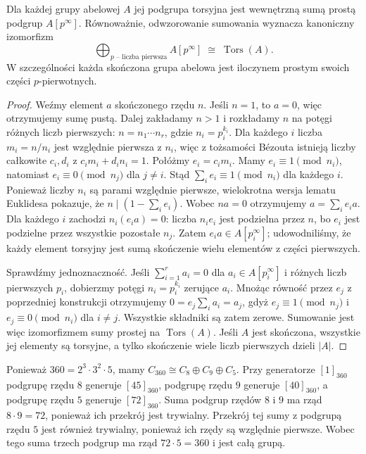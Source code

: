 \begin{twierdzenie}
\label{aa:tw:torsion-primary}
Dla każdej grupy abelowej $A$ jej podgrupa torsyjna jest
wewnętrzną sumą prostą podgrup $A[p^\infty]$.
Równoważnie, odwzorowanie sumowania wyznacza kanoniczny izomorfizm
\[
\bigoplus_{p\text{ -- liczba pierwsza}}A[p^\infty]
 \;\cong\;\operatorname{Tors}(A).
\]
W szczególności każda skończona grupa abelowa jest
iloczynem prostym swoich części $p$-pierwotnych.
\end{twierdzenie}
\begin{proof}
Weźmy element $a$ skończonego rzędu $n$.
Jeśli $n=1$, to $a=0$, więc otrzymujemy sumę pustą.
Dalej zakładamy $n>1$ i rozkładamy $n$ na potęgi różnych liczb pierwszych:
$n=n_1\cdots n_r$, gdzie $n_i=p_i^{k_i}$.
Dla każdego $i$ liczba $m_i=n/n_i$ jest względnie pierwsza
z $n_i$, więc z tożsamości Bézouta istnieją liczby całkowite
$c_i,d_i$ z $c_i m_i+d_i n_i=1$.
Połóżmy $e_i=c_i m_i$. Mamy $e_i\equiv1\pmod{n_i}$,
natomiast $e_i\equiv0\pmod{n_j}$ dla $j\ne i$.
Stąd $\sum_i e_i\equiv1\pmod {n_i}$ dla każdego $i$.
Ponieważ liczby $n_i$ są parami względnie pierwsze,
wielokrotna wersja lematu Euklidesa pokazuje, że
$n\mid(1-\sum_i e_i)$.
Wobec $na=0$ otrzymujemy
$a=\sum_i e_i a$.
Dla każdego $i$ zachodzi $n_i(e_i a)=0$:
liczba $n_i e_i$ jest podzielna przez $n$, bo $e_i$
jest podzielne przez wszystkie pozostałe $n_j$.
Zatem $e_i a\in A[p_i^\infty]$; udowodniliśmy, że
każdy element torsyjny jest sumą skończenie wielu elementów
z części pierwszych.

Sprawdźmy jednoznaczność. Jeśli
$\sum_{i=1}^r a_i=0$ dla $a_i\in A[p_i^\infty]$
i różnych liczb pierwszych $p_i$, dobierzmy potęgi
$n_i=p_i^{k_i}$ zerujące $a_i$. Mnożąc równość przez
$e_j$ z poprzedniej konstrukcji otrzymujemy
$0=e_j\sum_i a_i=a_j$, gdyż
$e_j\equiv1\pmod {n_j}$ i
$e_j\equiv0\pmod{n_i}$ dla $i\ne j$.
Wszystkie składniki są zatem zerowe.
Sumowanie jest więc izomorfizmem sumy prostej na
$\operatorname{Tors}(A)$. Jeśli $A$ jest skończona,
wszystkie jej elementy są torsyjne, a tylko skończenie
wiele liczb pierwszych dzieli $|A|$.
\end{proof}

\begin{przyklad}[Rozkład $C_{360}$]
\label{aa:prz:c360-primary}
Ponieważ $360=2^3\cdot3^2\cdot5$, mamy
$C_{360}\cong C_8\oplus C_9\oplus C_5$.
Przy generatorze $[1]_{360}$ podgrupę rzędu $8$
generuje $[45]_{360}$, podgrupę rzędu $9$ generuje
$[40]_{360}$, a podgrupę rzędu $5$ generuje
$[72]_{360}$. Suma podgrup rzędów $8$ i $9$ ma rząd
$8\cdot9=72$, ponieważ ich przekrój jest trywialny.
Przekrój tej sumy z podgrupą rzędu $5$ jest również trywialny,
ponieważ ich rzędy są względnie pierwsze. Wobec tego suma
trzech podgrup ma rząd $72\cdot5=360$ i jest całą grupą.
\end{przyklad}

